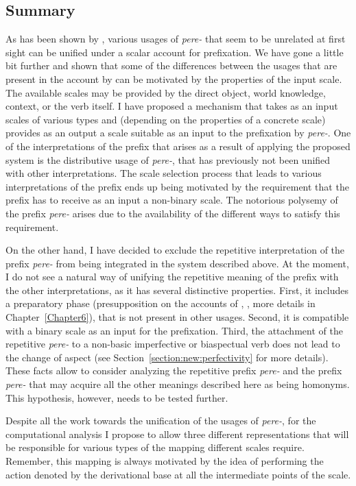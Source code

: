 \subsection{Summary}
As has been shown by \citet{Kagan:book}, various usages of \textit{pere-} that seem to be unrelated at first sight can be unified under a scalar account for prefixation. We have gone a little bit further and shown that some of the differences between the usages that are present in the account by \citet{Kagan:book} can be motivated by the properties of the input scale. The available scales may be provided by the direct object, world knowledge, context, or the verb itself. I have proposed a mechanism that takes as an input scales of various types and (depending on the properties of a concrete scale) provides as an output a scale suitable as an input to the prefixation by \textit{pere-}. One of the interpretations of the prefix that arises as a result of applying the proposed system is the distributive usage of \textit{pere-}, that has previously not been unified with other interpretations. The scale selection process that leads to various interpretations of the prefix ends up being motivated by the requirement that the prefix has to receive as an input a non-binary scale. The notorious polysemy of the prefix \textit{pere-} arises due to the availability of the different ways to satisfy this requirement. 

On the other hand, I have decided to exclude the repetitive interpretation of the prefix \textit{pere-} from being integrated in the system described above. At the moment, I do not see a natural way of unifying the repetitive meaning of the prefix with the other interpretations, as it has several distinctive properties. First, it includes a preparatory phase (presupposition on the accounts of \citealt{Demjjanow:97}, \citealt{Kagan:book}, more details in Chapter~\ref{Chapter6}), that is not present in other usages. Second, it is compatible with a binary scale as an input for the prefixation. Third, the attachment of the repetitive \textit{pere-} to a non-basic imperfective or biaspectual verb does not lead to the change of aspect (see Section~\ref{section:new:perfectivity} for more details). These facts allow to consider analyzing the repetitive prefix \textit{pere-} and the prefix \textit{pere-} that may acquire all the other meanings described here as being homonyms. This hypothesis, however, needs to be tested further.

Despite all the work towards the unification of the usages of \textit{pere-}, for the computational analysis I propose to allow three different representations that will be responsible for various types of the mapping different scales require. Remember, this mapping is always motivated by the idea of performing the action denoted by the derivational base at all the intermediate points of the scale. 


